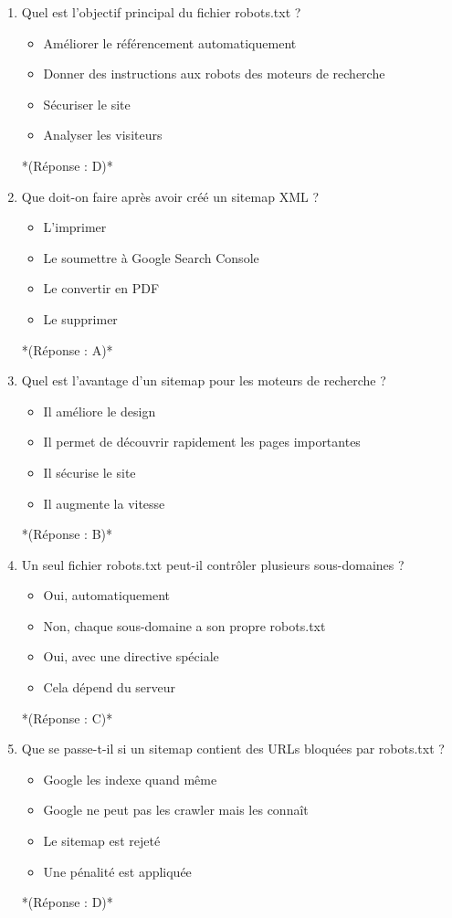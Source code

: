 \documentclass[12pt,a4paper,twoside]{report}
\begin{document}
\begin{enumerate}
\item Quel est l'objectif principal du fichier robots.txt ?
\begin{itemize}
\item[A)] Améliorer le référencement automatiquement
\item[B)] Donner des instructions aux robots des moteurs de recherche
\item[C)] Sécuriser le site
\item[D)] Analyser les visiteurs
\end{itemize}
*(Réponse : D)*

\item Que doit-on faire après avoir créé un sitemap XML ?
\begin{itemize}
\item[A)] L'imprimer
\item[B)] Le soumettre à Google Search Console
\item[C)] Le convertir en PDF
\item[D)] Le supprimer
\end{itemize}
*(Réponse : A)*

\item Quel est l'avantage d'un sitemap pour les moteurs de recherche ?
\begin{itemize}
\item[A)] Il améliore le design
\item[B)] Il permet de découvrir rapidement les pages importantes
\item[C)] Il sécurise le site
\item[D)] Il augmente la vitesse
\end{itemize}
*(Réponse : B)*

\item Un seul fichier robots.txt peut-il contrôler plusieurs sous-domaines ?
\begin{itemize}
\item[A)] Oui, automatiquement
\item[B)] Non, chaque sous-domaine a son propre robots.txt
\item[C)] Oui, avec une directive spéciale
\item[D)] Cela dépend du serveur
\end{itemize}
*(Réponse : C)*

\item Que se passe-t-il si un sitemap contient des URLs bloquées par robots.txt ?
\begin{itemize}
\item[A)] Google les indexe quand même
\item[B)] Google ne peut pas les crawler mais les connaît
\item[C)] Le sitemap est rejeté
\item[D)] Une pénalité est appliquée
\end{itemize}
*(Réponse : D)*


\end{enumerate}
\end{document}
